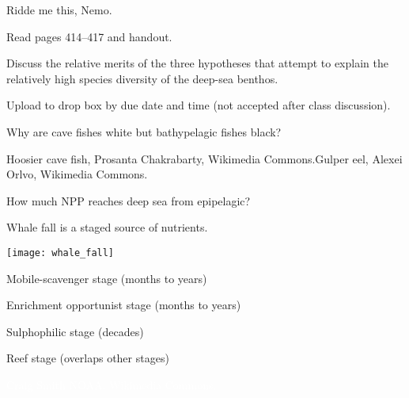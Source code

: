\documentclass[t]{beamer}
\begin{document}

\begin{frame}[t]{Ridde me this, Nemo.}

	\hangpara Read pages 414--417 and handout.

	\hangpara Discuss the relative merits of the three hypotheses that attempt to explain the relatively high species diversity of the deep-sea benthos.

	\hangpara Upload to drop box by due date and time (not accepted after class discussion).
	
\end{frame}

{
\begin{frame}[b]{Why are cave fishes white but bathypelagic fishes black?}

\tiny Hoosier cave fish, Prosanta Chakrabarty, Wikimedia Commons.\hfill Gulper eel, Alexei Orlvo, Wikimedia Commons.
\end{frame}}

{
\begin{frame}[t]{How much NPP reaches deep sea from epipelagic?}
\end{frame}}

\begin{frame}[t]{Whale fall is a staged source of nutrients.}

\vspace*{-\baselineskip}

	\begin{multicols}{2}
		{\centering
		\texttt{[image: whale\_fall]}\par}

	\columnbreak

		\hangpara Mobile-scavenger stage (months to years)

		\hangpara Enrichment opportunist stage (months to years)

		\hangpara Sulphophilic stage (decades)

		\hangpara Reef stage (overlaps other stages)

	\end{multicols}


\end{frame}

{
\begin{frame}[b]

\tiny\hfill\textcolor{white}{Craig Smith NOAA, Wikimedia Commons.}
\end{frame}}
\end{document}
